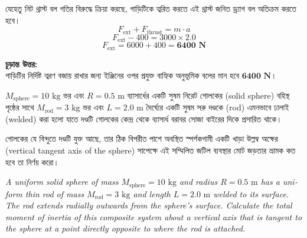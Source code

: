 \documentclass[12pt, a4paper]{article}
\begin{document}
\begin{tcolorbox}[solutionbox={সমাধান (Solution)}]
যেহেতু নিট থ্রাস্ট বল গতির বিরুদ্ধে ক্রিয়া করছে, গাড়িটিকে ত্বরিত করতে এই থ্রাস্ট জনিত ড্র্যাগ বল অতিক্রম করতে হবে।
$$F_{\text{ext}} + F_{\text{thrust}} = m \cdot a$$ 
$$F_{\text{ext}} - 400 = 3000 \times 2.0$$ 
$$F_{\text{ext}} = 6000 + 400 = \mathbf{6400\text{ N}}$$

\vspace{1em}
\begin{tcolorbox}[answerbox]
\textbf{চূড়ান্ত উত্তর:} \\
গাড়িটির নির্দিষ্ট ত্বরণ বজায় রাখার জন্য ইঞ্জিনের ওপর প্রযুক্ত বাহ্যিক অনুভূমিক বলের মান হবে $\mathbf{6400\text{ N}}$।
\end{tcolorbox}
\end{tcolorbox}

\begin{tcolorbox}[questionbox={প্রশ্ন (Question) 18}]
\noindent
$M_{\text{sphere}} = 10\text{ kg}$ ভর এবং $R = 0.5\text{ m}$ ব্যাসার্ধের একটি সুষম নিরেট গোলকের (solid sphere) বহিস্থ পৃষ্ঠের সাথে $M_{\text{rod}} = 3\text{ kg}$ ভর এবং $L = 2.0\text{ m}$ দৈর্ঘ্যের একটি সুষম সরু দণ্ডকে (rod) এমনভাবে ঢালাই (welded) করা হলো যাতে দণ্ডটি গোলকের কেন্দ্র থেকে ব্যাসার্ধ বরাবর সোজা বাইরের দিকে প্রসারিত থাকে। 

\vspace{0.3em}
\noindent
গোলকের যে বিন্দুতে দণ্ডটি যুক্ত আছে, তার ঠিক বিপরীত পাশে অবস্থিত স্পর্শকগামী একটি খাড়া উল্লম্ব অক্ষের (vertical tangent axis of the sphere) সাপেক্ষে এই সম্মিলিত জটিল ব্যবস্থার মোট জড়তার ভ্রামক কত হবে তা নির্ণয় করো।

\vspace{0.8em}
\begin{english}
\noindent\textit{\color{darkgray}
A uniform solid sphere of mass $M_{\text{sphere}} = 10\text{ kg}$ and radius $R = 0.5\text{ m}$ has a uniform thin rod of mass $M_{\text{rod}} = 3\text{ kg}$ and length $L = 2.0\text{ m}$ welded to its surface. The rod extends radially outwards from the sphere's surface. Calculate the total moment of inertia of this composite system about a vertical axis that is tangent to the sphere at a point directly opposite to where the rod is attached.
}
\end{english}
\end{tcolorbox}
\end{document}
